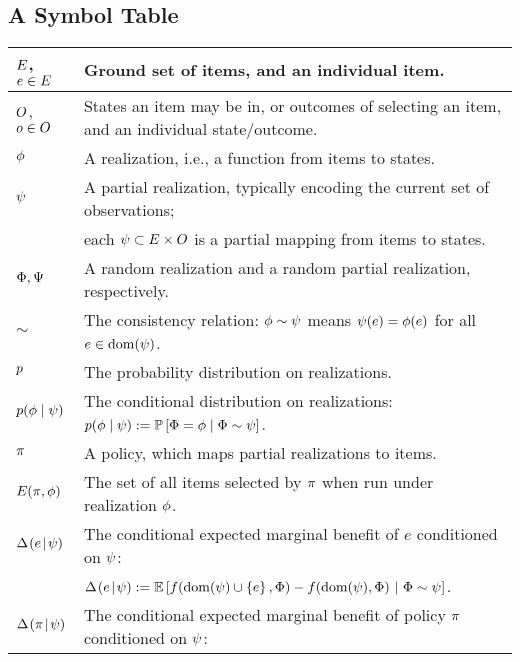 
%

\newcommand{\gimmespace}{\phantom{$\paren{\frac{\sum }{2}}$}}


\begin{table}[p]
\subsection{A Symbol Table} \label{sec:symbols} \vspace{1em}
  \begin{tabular}{|l|p{5in}|}
\hline
$\groundset$, $\elem \in \groundset$ & Ground set of items, and an individual item. \\
\hline
$\outcomes$, $\outcome \in \outcomes$ & States an item may be in, or outcomes of selecting an item, and an individual state/outcome. \\
\hline
$\rlz$ & A realization, i.e., a function from items to states. \\
\hline
$\prlz$ & A partial realization, typically encoding the current set of observations;\\
 &  each $\prlz \subset \groundset \times \outcomes$ is a partial
 mapping from items to states. \\
\hline
$\rvrlz, \rvprlz$ & A random realization and a random partial
realization, respectively.\\
%
\hline
$\sim$ & The consistency relation: $\rlz \sim \prlz$ means $\prlz(e) = \rlz(e)$ for all $e \in \dom(\prlz)$.\\
\hline
$\rlzmasssym$ & The probability distribution on realizations.\\
\hline
$\rlzmasssym(\rlz \mid \prlz)$ & The conditional distribution on realizations: $\rlzmasssym(\rlz \mid \prlz) :=
\prob{\rvrlz = \rlz \mid \rvrlz \sim \prlz}$.\\
\hline
$\policy$ & A policy, which maps partial realizations to items. \\
\hline
$\played{\policy}{\rlz}$ & The set of all items selected by $\policy$ when run
under realization $\rlz$. \\
\hline
$\diff{\prlz}{\elem}$ & The conditional expected marginal benefit of $e$ conditioned on $\prlz$: \\
                              & $\diff{\prlz}{\elem} := \expct{f(\dom(\prlz) \cup \set{\elem}, \rvrlz) -
   f(\dom(\prlz), \rvrlz)\ | \ \rvrlz\sim\prlz}$. \\
\hline
$\diff{\prlz}{\policy}$ & The conditional expected marginal benefit of
policy $\policy$ conditioned on $\prlz$: \\

\end{tabular}
\end{table}
